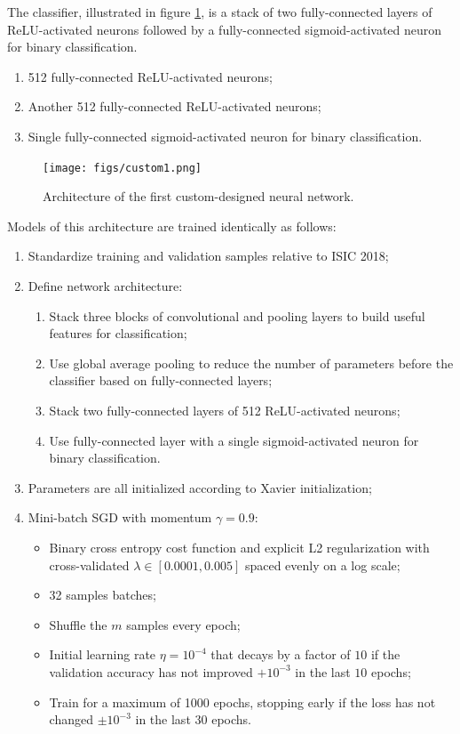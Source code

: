 The classifier, illustrated in figure \ref{fig:custom1}, is a stack of two fully-connected layers of ReLU-activated neurons followed by a fully-connected sigmoid-activated neuron for binary classification.

\begin{enumerate}
    \item 512 fully-connected ReLU-activated neurons;
    \item Another 512 fully-connected ReLU-activated neurons;
    \item Single fully-connected sigmoid-activated neuron for binary classification.
\end{enumerate}

\begin{figure}[ht]
    \centering
    \texttt{[image: figs/custom1.png]}
    \caption{Architecture of the first custom-designed neural network.}
    \label{fig:custom1}
\end{figure}

Models of this architecture are trained identically as follows:

\begin{enumerate}
    \item Standardize training and validation samples relative to \ac{ISIC} 2018;
    \item Define network architecture:
        \begin{enumerate}
            \item Stack three blocks of convolutional and pooling layers to build useful features for classification;
            \item Use global average pooling to reduce the number of parameters before the classifier based on fully-connected layers;
            \item Stack two fully-connected layers of 512 ReLU-activated neurons;
            \item Use fully-connected layer with a single sigmoid-activated neuron for binary classification.
        \end{enumerate}
    \item Parameters are all initialized according to Xavier initialization;
    \item Mini-batch \ac{SGD} with momentum $\gamma = 0.9$:
        \begin{itemize}
            \item Binary cross entropy cost function and explicit L2 regularization with cross-validated $\lambda \in [0.0001, 0.005]$ spaced evenly on a log scale;
            \item 32 samples batches;
            \item Shuffle the $m$ samples every epoch;
            \item Initial learning rate $\eta = 10^{-4}$ that decays by a factor of $10$ if the validation accuracy has not improved $+10^{-3}$ in the last $10$ epochs;
            \item Train for a maximum of 1000 epochs, stopping early if the loss has not changed $\pm 10^{-3}$ in the last $30$ epochs.
        \end{itemize}
\end{enumerate}

